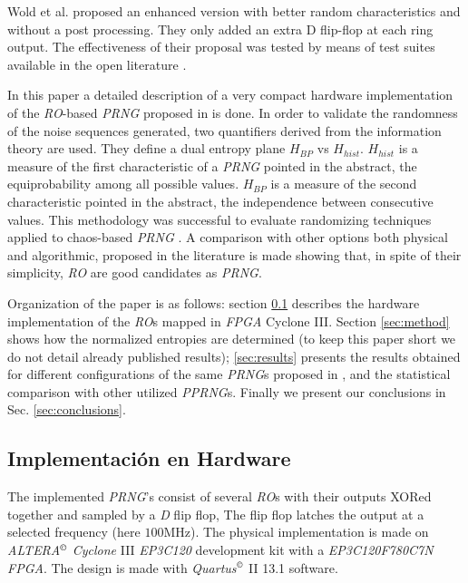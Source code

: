 Wold et al. \cite{Wold2009} proposed an enhanced version with
better random characteristics and without a post processing. They only
added an extra D flip-flop at each ring output. The
effectiveness of their proposal was tested by means of test suites available
in the open literature \cite{NIST2000,marsaglia1995,NIST2000a}.

In this paper a detailed description of a very compact hardware implementation of the \emph{RO}-based \emph{PRNG} proposed in \cite{Wold2009} is done.
In order to validate the randomness of the noise sequences generated, two quantifiers derived from the information theory are used. They define a dual entropy plane $H_{BP}$ vs $H_{hist}$.
$H_{hist}$ is a measure of the first characteristic of a \emph{PRNG} pointed in the abstract, the equiprobability among all possible values. $H_{BP}$ is a measure of the second characteristic pointed in the abstract, the independence between consecutive values. This methodology was successful to evaluate randomizing
techniques applied to chaos-based \emph{PRNG} \cite{DeMicco2008}. A comparison with other options both physical and algorithmic, proposed in the literature is made showing that, in spite of their simplicity, \emph{RO}  are good candidates as \emph{PRNG}.

Organization of the paper is as follows: section \ref{sec:hardware} describes the
hardware implementation of the \emph{RO}s mapped in
\emph{FPGA} Cyclone III. Section \ref{sec:method} shows how the normalized entropies are
determined (to keep this paper short we do not detail already
published results); \ref{sec:results} presents the
results obtained for different configurations of the same
\emph{PRNG}s proposed in \cite{Wold2009}, and the statistical comparison with other utilized \emph{PPRNG}s.
Finally we present our conclusions in Sec. \ref{sec:conclusions}.


\subsection{Implementación en Hardware}
\label{sec:hardware}

The implemented \emph{PRNG}'s consist of  several \emph{RO}s
with their outputs XORed together and sampled by a \emph{D} flip flop,
The flip flop latches the output at a selected frequency (here $100$MHz)\cite{Wold2009}.
The physical implementation is made on \emph{ALTERA}$^{\copyright}$  \emph{Cyclone} III \emph{EP3C120}
development kit with a \emph{EP3C120F780C7N} \emph{FPGA}. The design is made with \emph{Quartus}$^{\copyright}$  II 13.1 software.

